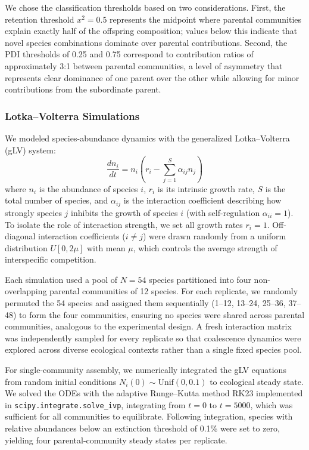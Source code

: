 We chose the classification thresholds based on two considerations. First, the retention threshold $x^2 = 0.5$ represents the midpoint where parental communities explain exactly half of the offspring composition; values below this indicate that novel species combinations dominate over parental contributions. Second, the PDI thresholds of 0.25 and 0.75 correspond to contribution ratios of approximately 3:1 between parental communities, a level of asymmetry that represents clear dominance of one parent over the other while allowing for minor contributions from the subordinate parent.


\subsubsection*{Lotka--Volterra Simulations}
\label{sec:suppl:methods:simulations}

We modeled species-abundance dynamics with the generalized Lotka--Volterra (gLV) system:
\begin{equation}
\frac{dn_i}{dt} = n_i \left( r_i - \sum_{j=1}^{S} \alpha_{ij} n_j \right)
\label{eq:glv}
\end{equation}
where $n_i$ is the abundance of species $i$, $r_i$ is its intrinsic growth rate, $S$ is the total number of species, and $\alpha_{ij}$ is the interaction coefficient describing how strongly species $j$ inhibits the growth of species $i$ (with self-regulation $\alpha_{ii} = 1$). To isolate the role of interaction strength, we set all growth rates $r_i = 1$. Off-diagonal interaction coefficients ($i \neq j$) were drawn randomly from a uniform distribution $U[0, 2\mu]$ with mean $\mu$, which controls the average strength of interspecific competition.

Each simulation used a pool of $N = 54$ species partitioned into four non-overlapping parental communities of 12 species. For each replicate, we randomly permuted the 54 species and assigned them sequentially (1--12, 13--24, 25--36, 37--48) to form the four communities, ensuring no species were shared across parental communities, analogous to the experimental design. A fresh interaction matrix was independently sampled for every replicate so that coalescence dynamics were explored across diverse ecological contexts rather than a single fixed species pool.

For single-community assembly, we numerically integrated the gLV equations from random initial conditions $N_i(0) \sim \text{Unif}(0, 0.1)$ to ecological steady state. We solved the ODEs with the adaptive Runge--Kutta method RK23 implemented in \texttt{scipy.integrate.solve\_ivp}, integrating from $t = 0$ to $t = 5000$, which was sufficient for all communities to equilibrate. Following integration, species with relative abundances below an extinction threshold of 0.1\% were set to zero, yielding four parental-community steady states per replicate.

